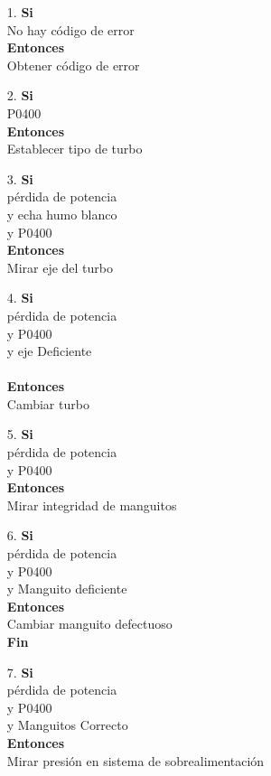 \documentclass[a4paper,12pt]{article}
\newcommand\tab[1][1cm]{\hspace*{#1}}
\begin{document}
\begin{itemize}
\item[1.]\textbf{Si}\\ \tab No hay código de error\\\textbf{Entonces}\\ \tab Obtener código de error
\item[2.]\textbf{Si}\\ \tab P0400\\ \textbf{Entonces}\\ \tab Establecer tipo de turbo
\item[3.]\textbf{Si}\\ \tab pérdida de potencia\\ \tab y echa humo blanco\\ \tab y P0400\\ \textbf{Entonces}\\ \tab Mirar eje del turbo
\item[4.]\textbf{Si}\\ \tab pérdida de potencia\\ \tab y P0400\\ \tab y eje Deficiente\\ \\\textbf{Entonces}\\ \tab Cambiar turbo
\item[5.]\textbf{Si}\\ \tab pérdida de potencia\\ \tab y P0400\\ \textbf{Entonces}\\ \tab Mirar integridad de manguitos
\item[6.]\textbf{Si}\\ \tab pérdida de potencia\\ \tab y P0400\\ \tab y Manguito deficiente\\ \textbf{Entonces}\\ \tab Cambiar manguito defectuoso\\ \tab \textbf{Fin}
\item[7.]\textbf{Si}\\ \tab pérdida de potencia\\ \tab y P0400\\ \tab y Manguitos Correcto\\ \textbf{Entonces}\\ \tab Mirar presión en sistema de sobrealimentación

\end{itemize}
\end{document}
